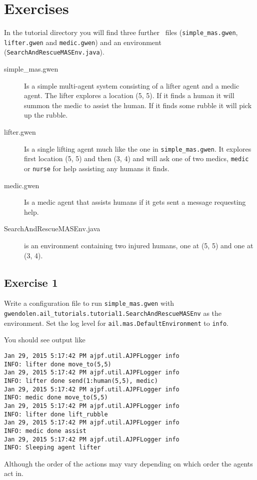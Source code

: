 \section{Exercises}
In the tutorial directory you will find three further \gwendolen\ files (\texttt{simple\_mas.gwen}, \texttt{lifter.gwen} and \texttt{medic.gwen}) and an environment (\texttt{SearchAndRescueMASEnv.java}).  
\begin{description}
\item[simple\_mas.gwen] Is a simple multi-agent system consisting of a lifter agent and a medic agent.  The lifter explores a location (5, 5).  If it finds a human it will summon the medic to assist the human.  If it finds some rubble it will pick up the rubble.
\item[lifter.gwen] Is a single lifting agent much like the one in \texttt{simple\_mas.gwen}.  It explores first location (5, 5) and then (3, 4) and will ask one of two medics, \texttt{medic} or \texttt{nurse} for help assisting any humans it finds.
\item[medic.gwen] Is a medic agent that assists humans if it gets sent a message requesting help.
\item[SearchAndRescueMASEnv.java] is an environment containing two injured humans, one at (5, 5) and one at (3, 4).
\end{description}

\subsection{Exercise 1}
\begin{sloppypar}
Write a configuration file to run \texttt{simple\_mas.gwen} with \texttt{gwendolen.ail\_tutorials.tutorial1.SearchAndRescueMASEnv} as the environment.  Set the log level for \texttt{ail.mas.DefaultEnvironment} to \texttt{info}.
\end{sloppypar}

You should see output like
\begin{verbatim}
Jan 29, 2015 5:17:42 PM ajpf.util.AJPFLogger info
INFO: lifter done move_to(5,5)
Jan 29, 2015 5:17:42 PM ajpf.util.AJPFLogger info
INFO: lifter done send(1:human(5,5), medic)
Jan 29, 2015 5:17:42 PM ajpf.util.AJPFLogger info
INFO: medic done move_to(5,5)
Jan 29, 2015 5:17:42 PM ajpf.util.AJPFLogger info
INFO: lifter done lift_rubble
Jan 29, 2015 5:17:42 PM ajpf.util.AJPFLogger info
INFO: medic done assist
Jan 29, 2015 5:17:42 PM ajpf.util.AJPFLogger info
INFO: Sleeping agent lifter
\end{verbatim}
Although the order of the actions may vary depending on which order the agents act in.

